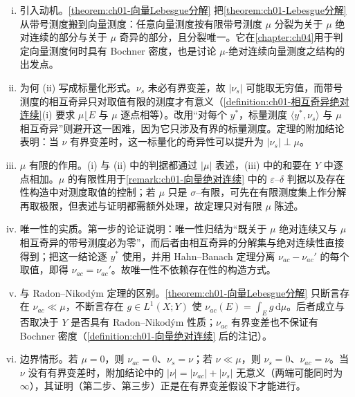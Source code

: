 \documentclass[../../main.tex]{subfiles}%
\begin{document}
\begin{remark}\label{remark:ch01-向量Lebesgue分解注}
\begin{enumerate}[(i)]
\item 引入动机。\cref{theorem:ch01-向量Lebesgue分解} 把\cref{theorem:ch01-Lebesgue分解} 从带号测度搬到向量测度：任意向量测度按有限带号测度 $\mu$ 分裂为关于 $\mu$ 绝对连续的部分与关于 $\mu$ 奇异的部分，且分裂唯一。它在\cref{chapter:ch04}用于判定向量测度何时具有 Bochner 密度，也是讨论 $\mu$-绝对连续向量测度之结构的出发点。
\item 为何 (ii) 写成标量化形式。$\nu_s$ 未必有界变差，故 $|\nu_s|$ 可能取无穷值，而带号测度的相互奇异只对取值有限的测度才有意义（\cref{definition:ch01-相互奇异绝对连续}(i) 要求 $\mu\lfloor E$ 与 $\mu$ 逐点相等）。改用“对每个 $y^*$，标量测度 $\langle y^*,\nu_s\rangle$ 与 $\mu$ 相互奇异”则避开这一困难，因为它只涉及有界的标量测度。定理的附加结论表明：当 $\nu$ 有界变差时，这一标量化的奇异性可以提升为 $|\nu_s|\perp\mu$。
\item $\mu$ 有限的作用。(i) 与 (ii) 中的判据都通过 $|\mu|$ 表述，(iii) 中的和要在 $Y$ 中逐点相加。$\mu$ 的有限性用于\cref{remark:ch01-向量绝对连续} 中的 $\varepsilon$--$\delta$ 判据以及存在性构造中对测度取值的控制；若 $\mu$ 只是 $\sigma$--有限，可先在有限测度集上作分解再取极限，但表述与证明都需额外处理，故定理只对有限 $\mu$ 陈述。
\item 唯一性的实质。第一步的论证说明：唯一性归结为“既关于 $\mu$ 绝对连续又与 $\mu$ 相互奇异的带号测度必为零”，而后者由相互奇异的分解集与绝对连续性直接得到；把这一结论逐 $y^*$ 使用，并用 Hahn--Banach 定理分离 $\nu_{ac}-\nu_{ac}'$ 的每个取值，即得 $\nu_{ac}=\nu_{ac}'$。故唯一性不依赖存在性的构造方式。
\item 与 Radon--Nikodým 定理的区别。\cref{theorem:ch01-向量Lebesgue分解} 只断言存在 $\nu_{ac}\ll\mu$，不断言存在 $g\in L^1(X;Y)$ 使 $\nu_{ac}(E)=\int_Eg\,\mathrm{d}\mu$。后者成立与否取决于 $Y$ 是否具有 Radon--Nikodým 性质；$\nu_{ac}$ 有界变差也不保证有 Bochner 密度（\cref{definition:ch01-向量绝对连续} 后的注记）。
\item 边界情形。若 $\mu=0$，则 $\nu_{ac}=0$、$\nu_s=\nu$；若 $\nu\ll\mu$，则 $\nu_s=0$、$\nu_{ac}=\nu$。当 $\nu$ 没有有界变差时，附加结论中的 $|\nu|=|\nu_{ac}|+|\nu_s|$ 无意义（两端可能同时为 $\infty$），其证明（第二步、第三步）正是在有界变差假设下才能进行。
\end{enumerate}
\end{remark}
\end{document}

